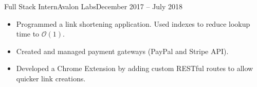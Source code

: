\begin{cvsubsection}{Full Stack Intern}{Avalon Labs}{December 2017 -- July 2018}
	\begin{itemize}
		\item Programmed a link shortening application. Used indexes to reduce lookup time to $\mathcal{O}(1)$.
		\item Created and managed payment gateways (PayPal and Stripe API).
		\item Developed a Chrome Extension by adding custom RESTful routes to allow quicker link creations.
	\end{itemize}
\end{cvsubsection}